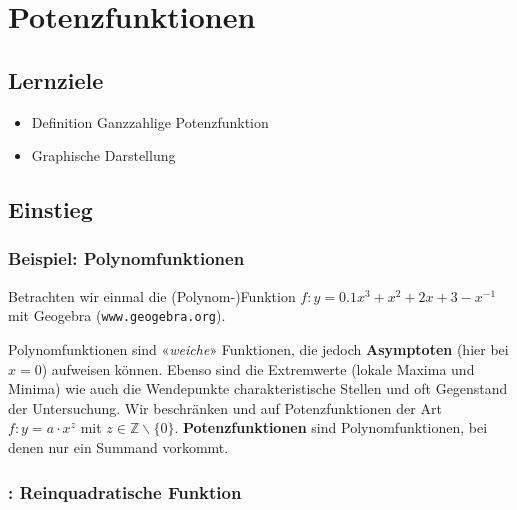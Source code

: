 \section{Potenzfunktionen}

\subsection*{Lernziele}

\begin{itemize}
\item Definition Ganzzahlige Potenzfunktion
\item Graphische Darstellung
\end{itemize}
\newpage


\subsection{Einstieg}

\subsubsection{Beispiel: Polynomfunktionen}

Betrachten wir einmal die (Polynom-)Funktion $f: y = 0.1x^3 + x^2 + 2x + 3 - x^{-1}$ \zB mit Geogebra (\texttt{www.geogebra.org}).



Polynomfunktionen sind «\textit{weiche}» Funktionen, die jedoch \textbf{Asymptoten} (hier bei $x=0$) aufweisen können.
Ebenso sind die Extremwerte (lokale Maxima und Minima) wie auch die Wendepunkte charakteristische Stellen und oft Gegenstand der Untersuchung.
Wir beschränken und auf Potenzfunktionen der Art $f: y=a\cdot{}x^z$
mit $z \in \mathbb{Z}\backslash\{0\}$. \textbf{Potenzfunktionen} sind
Polynomfunktionen, bei denen nur ein Summand vorkommt.
\newpage



\subsubsection{: Reinquadratische Funktion}


